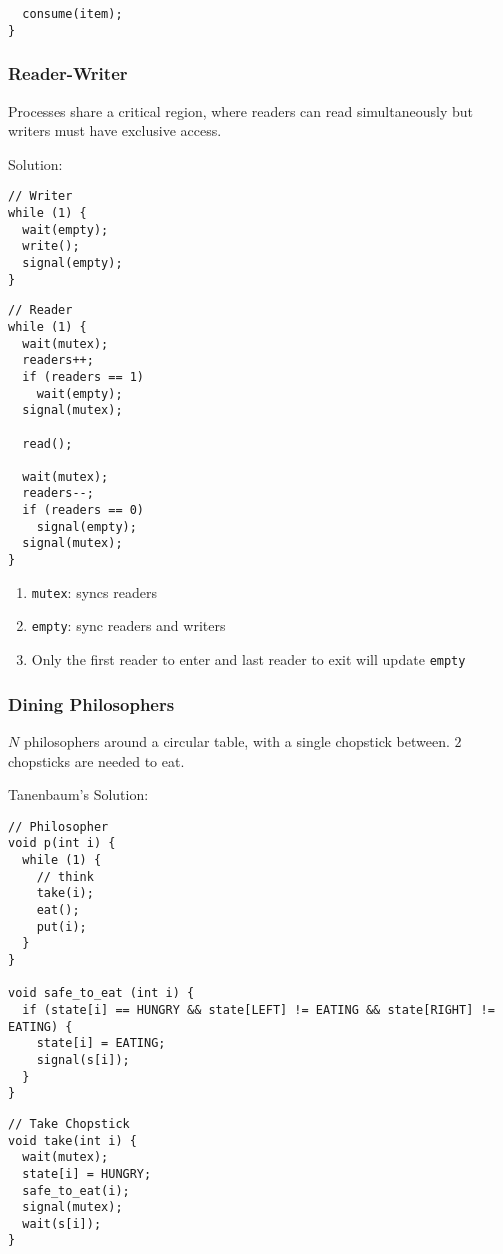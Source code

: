 \documentclass[12pt, a4paper]{article}
\begin{document}
\begin{multicols*}{3}
\begin{minipage}{0.5\columnwidth}
\begin{lstlisting}
  consume(item);
}
  \end{lstlisting}
\end{minipage}

\colbreak
\subsubsection{Reader-Writer}
Processes share a critical region, where readers can read simultaneously but writers must have exclusive access.

Solution:\\
\begin{minipage}{0.45\columnwidth}
  \begin{lstlisting}
// Writer
while (1) {
  wait(empty);
  write();
  signal(empty);
}
  \end{lstlisting}
\end{minipage}
\begin{minipage}{0.5\columnwidth}
  \begin{lstlisting}
// Reader 
while (1) {
  wait(mutex);
  readers++;
  if (readers == 1)
    wait(empty);
  signal(mutex);

  read();

  wait(mutex);
  readers--;
  if (readers == 0)
    signal(empty);
  signal(mutex);
}
  \end{lstlisting}
\end{minipage}
\begin{enumerate}[\roman*.]
  \item \lstinline|mutex|: syncs readers 
  \item \lstinline|empty|: sync readers and writers 
  \item Only the first reader to enter and last reader to exit will update \lstinline|empty|
\end{enumerate}
\colbreak
\subsubsection{Dining Philosophers}
$N$ philosophers around a circular table, with a single chopstick between. $2$ chopsticks are needed to eat.

Tanenbaum's Solution:\\
\begin{minipage}{0.48\columnwidth}
  \begin{lstlisting}
// Philosopher
void p(int i) {
  while (1) {
    // think
    take(i);
    eat();
    put(i);
  }
}

void safe_to_eat (int i) {
  if (state[i] == HUNGRY && state[LEFT] != EATING && state[RIGHT] != EATING) {
    state[i] = EATING;
    signal(s[i]);
  }
}
  \end{lstlisting}
\end{minipage}
\begin{minipage}{0.45\columnwidth}
  \begin{lstlisting}
// Take Chopstick
void take(int i) {
  wait(mutex);
  state[i] = HUNGRY;
  safe_to_eat(i);
  signal(mutex);
  wait(s[i]);
}


\end{lstlisting}
\end{minipage}
\end{multicols*}
\end{document}
